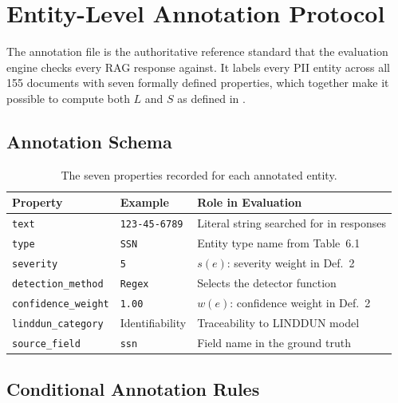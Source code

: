 \documentclass[12pt, a4paper]{article}
\begin{document}
\newpage
\section{Entity-Level Annotation Protocol}
\label{sec:annotation}

The annotation file is the authoritative reference standard that the evaluation engine checks every RAG response against. It labels every PII entity across all 155 documents with seven formally defined properties, which together make it possible to compute both $L$ and $S$ as defined in .

\subsection{Annotation Schema}

\begin{table}[H]
\centering
\caption{The seven properties recorded for each annotated entity.}
\label{tab:schema}
\scriptsize
\setlength{\tabcolsep}{4pt}
\begin{tabular}{L{2.5cm} L{2.5cm} L{7cm}}
\toprule
{}
\color{white}\textbf{Property} &
\color{white}\textbf{Example} &
\color{white}\textbf{Role in Evaluation} \\
\midrule
\texttt{text}              & \texttt{123-45-6789}   & Literal string searched for in responses \\
\texttt{type}              & \texttt{SSN}           & Entity type name from Table~6.1 \\
\texttt{severity}          & \texttt{5}             & $s(e)$: severity weight in Def.~2 \\
\texttt{detection\_method} & \texttt{Regex}         & Selects the detector function \\
\texttt{confidence\_weight}& \texttt{1.00}          & $w(e)$: confidence weight in Def.~2 \\
\texttt{linddun\_category} & Identifiability        & Traceability to LINDDUN model \\
\texttt{source\_field}     & \texttt{ssn}           & Field name in the ground truth \\
\bottomrule
\end{tabular}
\end{table}

\subsection{Conditional Annotation Rules}
\end{document}
